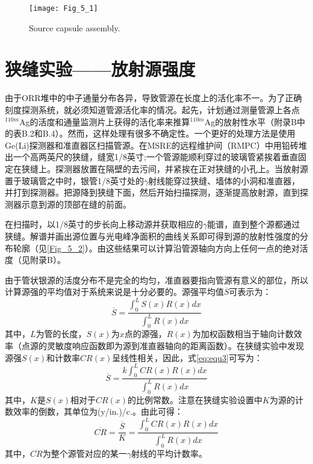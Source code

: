 \begin{figure}
\centering
\texttt{[image: Fig\_5\_1]}
\caption{Source capsule assembly.}
\label{Fig_5_1}
\end{figure}

\section{狭缝实验——放射源强度}

由于ORR堆中的中子通量分布各异，导致管源在长度上的活化率不一。为了正确刻度探测系统，就必须知道管源活化率的情况。起先，计划通过测量管源上各点$^{110m}$Ag的活度和通量监测片上获得的活化率来推算$^{110m}$Ag的放射性水平（附录B中的表B.2和B.4）。然而，这样处理有很多不确定性。一个更好的处理方法是使用Ge(Li)探测器和准直器区扫描管源。在MSRE的远程维护间（RMPC）中用铅砖堆出一个高两英尺的狭缝，缝宽1/8英寸;一个管源能顺利穿过的玻璃管紧挨着垂直固定在狭缝上。探测器放置在隔壁的去污间，并紧挨在正对狭缝的小孔上。当放射源置于玻璃管之中时，银管1/8英寸处的$\gamma$射线能穿过狭缝、墙体的小洞和准直器，并打到探测器。把源降到狭缝下面，然后开始扫描探测，逐渐提高放射源，直到探测器示意到源的顶部在缝的前面。

在扫描时，以1/8英寸的步长向上移动源并获取相应的$\gamma$能谱，直到整个源都通过狭缝。解谱并画出源位置与光电峰净面积的曲线关系即可得到源的放射性强度的分布轮廓（见\ref{Fig_5_2}）。由这些结果可以计算沿管源轴向方向上任何一点的绝对活度（见附录B）。

由于管状银源的活度分布不是完全的均匀，准直器要指向管源有意义的部位，所以计算源强的平均值对于系统来说是十分必要的。源强平均值$\overline{S}$可表示为：
\begin{equation}
\label{eq:equ3}
\overline{S}=\frac{\int_{0}^{L} S(x) R(x) dx}{\int_{0}^{L} R(x) dx}
\end{equation}
其中，$L$为管的长度，$S(x)$为$x$点的源强，$R(x)$为加权函数相当于轴向计数效率（点源的灵敏度响应函数即为源到准直器轴向的距离函数）。在狭缝实验中发现源强$S(x)$和计数率$CR(x)$呈线性相关，因此，式\ref{eq:equ3}可写为：
\begin{equation}
\label{eq:equ4}
\overline{S}=\frac{k \int_{0}^{L} CR(x) R(x) dx}{\int_{0}^{L} R(x) dx}
\end{equation}
其中，$K$是$S(x)$相对于$CR(x)$的比例常数。注意在狭缝实验设置中$K$为源的计数效率的倒数，其单位为(y/in.)/c.。由此可得：
\begin{equation}
\label{eq:equ5}
\overline{CR}=\frac{\overline{S}}{K}=\frac{\int_{0}^{L} CR(x) R(x) dx}{\int_{0}^{L} R(x) dx}
\end{equation}
其中，$\overline{CR}$为整个源管对应的某一$\gamma$射线的平均计数率。


